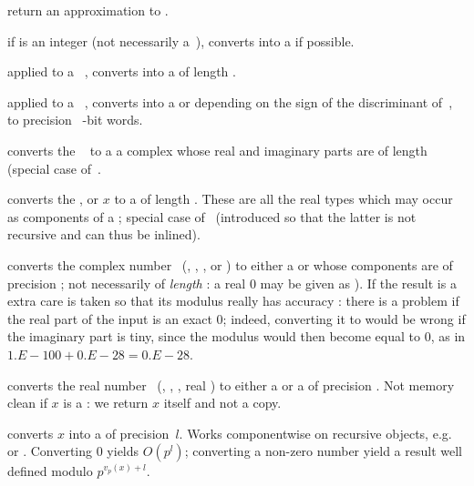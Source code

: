  return an approximation to .

 if  is an integer (not necessarily
a~), converts  into a  if possible.

 applied to a ~, converts
 into a  of length .

 applied to a ~, converts
 into a  or  depending on the sign of the
discriminant of~, to precision \hbox{ \B-bit} words.

 converts the ~ to a
a complex whose real and imaginary parts are  of length 
(special case of~.

 converts the
,  or  $x$ to a  of length .
These are all the real types which may occur as components of a
; special case of~ (introduced so that the latter is
not recursive and can thus be inlined).

 converts the complex number~
(, , ,  or ) to either
a  or  whose components are  of precision
; not necessarily of \emph{length} : a real $0$ may be
given as ). If the result is a  extra care is
taken so that its modulus really has accuracy : there is a problem
if the real part of the input is an exact $0$; indeed, converting it to
 would be wrong if the imaginary part is tiny, since the
modulus would then become equal to $0$, as in $1.E-100 + 0.E-28 = 0.E-28$.

 converts the real number~
(, , , real ) to either
a  or a  of precision . Not memory clean
if $x$ is a : we return $x$ itself and not a copy.

 converts $x$ into a 
of precision~$l$. Works componentwise on recursive objects,
e.g.~ or . Converting $0$ yields $O(p^l)$; converting a
non-zero number yield a result well defined modulo $p^{v_p(x) + l}$.

